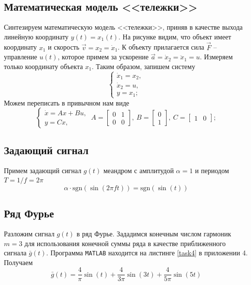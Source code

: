 \documentclass[a4paper, 12pt]{article}
\begin{document}
    \subsection{Математическая модель <<тележки>>}
    Синтезируем математическую модель <<тележки>>,
    приняв в качестве выхода линейную координату
    $y(t)=x_1(t)$. На рисунке видим, что объект
    имеет координату $x_1$ и скорость $\vec{v}=x_2=\dot{x}_1$.
    К объекту прилагается сила $\vec{F}$ -- управление $u(t)$,
    которое примем за ускорение $\vec{a}=\dot{x}_2=\ddot{x}_1=u$.
    Измеряем только координату объекта $x_1$. Таким образом, запишем систему
    $$
    \begin{cases}
        \dot{x}_1=x_2,\\
        \dot{x}_2=u,\\
        y=x_1;
    \end{cases}
    $$
    Можем переписать в привычном нам виде
    $$
    \begin{cases}
        \dot{x}=Ax+Bu,\\
        y=Cx,
    \end{cases}\ A=\begin{bmatrix}
        0 &1\\
        0 &0
    \end{bmatrix},\ B=\begin{bmatrix}
        0\\1
    \end{bmatrix},\ C=\begin{bmatrix}
        1 &0
    \end{bmatrix};
    $$


    \subsection{Задающий сигнал}
    Примем задающий сигнал $g(t)$ меандром
    с амплитудой $\alpha=1$ и периодом $T=1/f=2\pi$
    $$\alpha\cdot\mathrm{sgn}\left( \sin(2\pi f t) \right)=\mathrm{sgn}\left( \sin(t) \right)$$


    \subsection{Ряд Фурье}
    Разложим сигнал $g(t)$ в ряд Фурье. Зададимся конечным
    числом гармоник $m=3$ для использования конечной
    суммы ряда в качестве приближенного сигнала $\bar{g}(t)$.
    Программа \texttt{MATLAB} находится на листинге \ref{task4}
    в приложении 4. Получаем
    $$
    \bar{g}(t)=\dfrac{4}{\pi}\sin(t)+\dfrac{4}{3\pi}\sin(3t)+\dfrac{4}{5\pi}\sin(5t)
    $$
\end{document}
